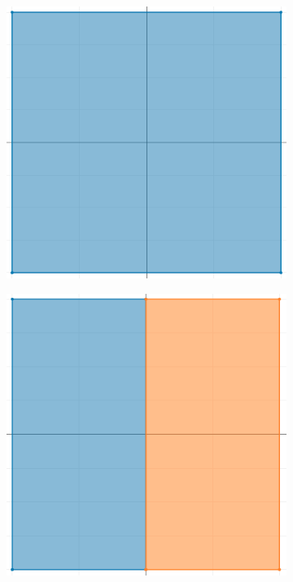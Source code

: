 \documentclass[12pt,a4paper]{article}
\begin{document}
    \begin{figure}[H]
        \centering
        \begin{subfigure}[t]{0.3\textwidth}
            \centering
            \includegraphics[scale=0.2]{bisect_0.png}
        \end{subfigure}
        \begin{subfigure}[t]{0.3\textwidth}
            \centering
            \includegraphics[scale=0.2]{bisect_1.png}
        \end{subfigure}

\end{figure}
\end{document}
